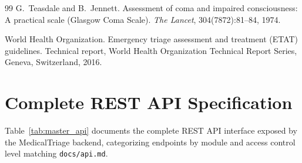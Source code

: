 \documentclass[11pt,a4paper,oneside]{report}
\begin{document}
\begin{thebibliography}{99}
G.~Teasdale and B.~Jennett.
\newblock Assessment of coma and impaired consciousness: A practical scale (Glasgow Coma Scale).
\newblock \textit{The Lancet}, 304(7872):81--84, 1974.

World Health Organization.
\newblock Emergency triage assessment and treatment (ETAT) guidelines.
\newblock Technical report, World Health Organization Technical Report Series, Geneva, Switzerland, 2016.

\end{thebibliography}

\appendix

\chapter{Complete REST API Specification}

Table~\ref{tab:master_api} documents the complete REST API interface exposed by the MedicalTriage backend, categorizing endpoints by module and access control level matching \texttt{docs/api.md}.
\end{document}
